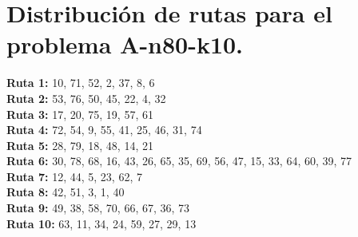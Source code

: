 \documentclass[a4paper,10pt,twocolumn]{article}
\begin{document}
	
	\section*{Distribución de rutas para el problema A-n80-k10.}
	\label{tab:result80_10}
	
	\hspace{-10pt}\textbf{Ruta 1:} 10, 71, 52, 2, 37, 8, 6	\\
	\textbf{Ruta 2:} 53, 76, 50, 45, 22, 4, 32	\\
	\textbf{Ruta 3:} 17, 20, 75, 19, 57, 61	\\
	\textbf{Ruta 4:} 72, 54, 9, 55, 41, 25, 46, 31, 74	\\
	\textbf{Ruta 5:} 28, 79, 18, 48, 14, 21	\\
	\textbf{Ruta 6:} 30, 78, 68, 16, 43, 26, 65, 35, 69, 56, 47, 15, 33, 64, 60, 39, 77	\\
	\textbf{Ruta 7:} 12, 44, 5, 23, 62, 7	\\
	\textbf{Ruta 8:} 42, 51, 3, 1, 40	\\
	\textbf{Ruta 9:} 49, 38, 58, 70, 66, 67, 36, 73 \\
	\textbf{Ruta 10:} 63, 11, 34, 24, 59, 27, 29, 13	\\
	
\end{document}
